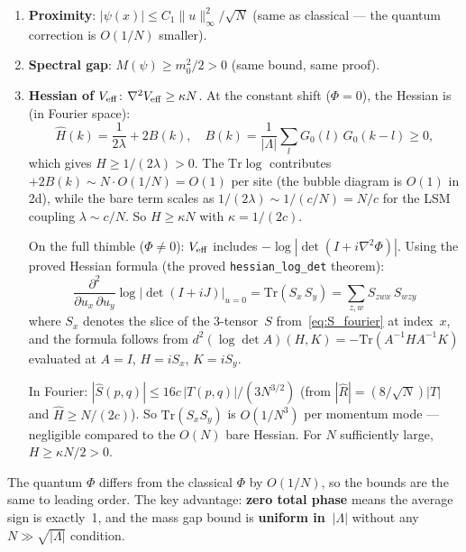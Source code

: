 \documentclass[12pt]{article}
\theoremstyle{definition}
\theoremstyle{remark}
\newcommand{\Tr}{\mathrm{Tr}}
\newcommand{\La}{\Lambda}
\begin{document}
\begin{enumerate}
\item \textbf{Proximity}: $|\psi(x)| \le C_1\|u\|_\infty^2/\sqrt{N}$
  (same as classical --- the quantum correction is $O(1/N)$ smaller).
\item \textbf{Spectral gap}: $M(\psi) \ge m_0^2/2 > 0$
  (same bound, same proof).
\item \textbf{Hessian of $V_{\rm eff}$}:
  $\nabla^2 V_{\rm eff} \ge \kappa N$. At the constant shift
  ($\Phi=0$), the Hessian is (in Fourier space):
  \begin{equation}
    \hat{H}(k) = \frac{1}{2\lambda} + 2B(k), \quad
    B(k) = \frac{1}{|\La|}\sum_l G_0(l)\,G_0(k{-}l) \ge 0,
  \end{equation}
  which gives $H \ge 1/(2\lambda) > 0$. The $\Tr\log$ contributes
  $+2B(k) \sim N \cdot O(1/N) = O(1)$ per site (the bubble diagram
  is $O(1)$ in 2d), while the bare term scales as
  $1/(2\lambda) \sim 1/(c/N) = N/c$ for the LSM coupling $\lambda
  \sim c/N$. So $H \ge \kappa N$ with $\kappa = 1/(2c)$.

  On the full thimble ($\Phi \ne 0$): $V_{\rm eff}$ includes
  $-\log|\det(I+i\nabla^2\Phi)|$. Using the proved Hessian formula
  (the proved \texttt{hessian\_log\_det} theorem):
  \begin{equation}
    \frac{\partial^2}{\partial u_x\,\partial u_y}
      \log|\det(I+iJ)|_{u=0}
    = \Tr(S_x\,S_y)
    = \sum_{z,w} S_{zwx}\,S_{wzy}
  \end{equation}
  where $S_x$ denotes the slice of the 3-tensor~$S$
  from~\eqref{eq:S_fourier} at index~$x$, and the formula
  follows from $d^2(\log\det A)(H,K) = -\Tr(A^{-1}HA^{-1}K)$
  evaluated at $A = I$, $H = iS_x$, $K = iS_y$.

  In Fourier: $|\hat{S}(p,q)| \le 16c\,|T(p,q)|/(3N^{3/2})$
  (from $|\hat{R}| = (8/\sqrt{N})|T|$ and
  $\hat{H} \ge N/(2c)$). So $\Tr(S_x S_y)$ is $O(1/N^3)$
  per momentum mode --- negligible compared to the $O(N)$ bare
  Hessian. For $N$ sufficiently large, $H \ge \kappa N/2 > 0$.
\end{enumerate}

The quantum $\Phi$ differs from the classical $\Phi$ by
$O(1/N)$, so the bounds are the same to leading order. The
key advantage: \textbf{zero total phase} means the average
sign is exactly~1, and the mass gap bound is
\textbf{uniform in~$|\La|$} without any $N \gg \sqrt{|\La|}$
condition.
\end{document}
